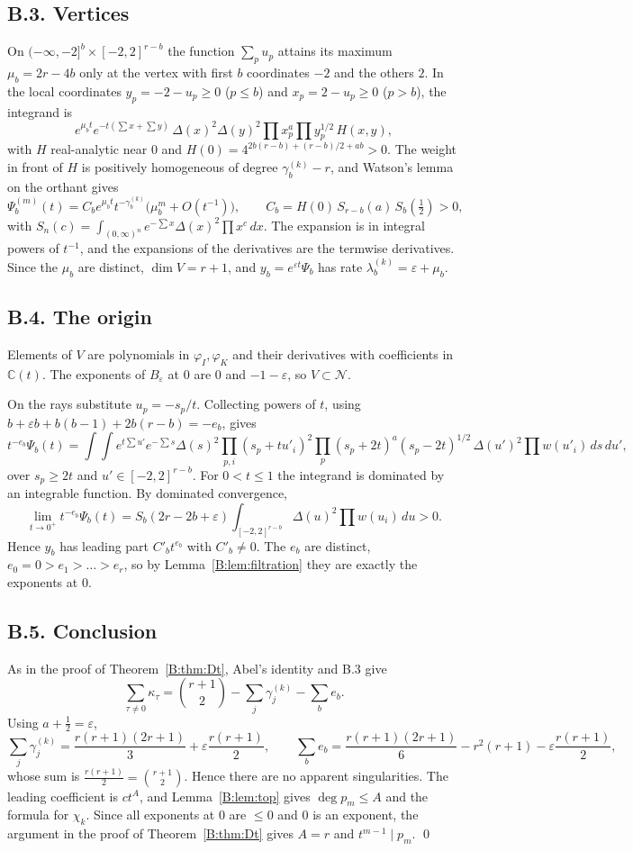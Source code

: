 \documentclass[11pt,a4paper]{article}
\theoremstyle{definition}
\theoremstyle{remark}
\newcommand{\C}{\mathbb C}
\numberwithin{equation}{section}
\begin{document}
\subsection*{B.3. Vertices}
On $(-\infty,-2]^b\times[-2,2]^{r-b}$ the function $\sum_pu_p$ attains its maximum $\mu_b=2r-4b$ only at the vertex with first $b$ coordinates $-2$ and the others $2$. In the local coordinates $y_p=-2-u_p\ge0$ ($p\le b$) and $x_p=2-u_p\ge0$ ($p>b$), the integrand is
\[
e^{\mu_bt}e^{-t(\sum x+\sum y)}\,\Delta(x)^2\Delta(y)^2\prod x_p^a\prod y_p^{1/2}\,H(x,y),
\]
with $H$ real-analytic near $0$ and $H(0)=4^{2b(r-b)+(r-b)/2+ab}>0$. The weight in front of $H$ is positively homogeneous of degree $\gamma^{(k)}_b-r$, and Watson's lemma on the orthant gives
\[
\Psi_b^{(m)}(t)=C_be^{\mu_bt}t^{-\gamma^{(k)}_b}\bigl(\mu_b^m+O(t^{-1})\bigr),\qquad C_b=H(0)\,S_{r-b}(a)\,S_b(\tfrac12)>0,
\]
with $S_n(c)=\int_{(0,\infty)^n}e^{-\sum x}\Delta(x)^2\prod x^c\,dx$. The expansion is in integral powers of $t^{-1}$, and the expansions of the derivatives are the termwise derivatives. Since the $\mu_b$ are distinct, $\dim V=r+1$, and $y_b=e^{\varepsilon t}\Psi_b$ has rate $\lambda^{(k)}_b=\varepsilon+\mu_b$.

\subsection*{B.4. The origin}
Elements of $V$ are polynomials in $\varphi_I,\varphi_K$ and their derivatives with coefficients in $\C(t)$. The exponents of $B_\varepsilon$ at $0$ are $0$ and $-1-\varepsilon$, so $V\subset\mathcal N$.

On the rays substitute $u_p=-s_p/t$. Collecting powers of $t$, using $b+\varepsilon b+b(b-1)+2b(r-b)=-e_b$, gives
\[
t^{-e_b}\Psi_b(t)=\int\!\!\int e^{t\sum u'}e^{-\sum s}\Delta(s)^2\prod_{p,i}(s_p+tu'_i)^2\prod_p(s_p+2t)^a(s_p-2t)^{1/2}\,\Delta(u')^2\prod w(u'_i)\,ds\,du',
\]
over $s_p\ge2t$ and $u'\in[-2,2]^{r-b}$. For $0<t\le1$ the integrand is dominated by an integrable function. By dominated convergence,
\[
\lim_{t\to0^+}t^{-e_b}\Psi_b(t)=S_b(2r-2b+\varepsilon)\int_{[-2,2]^{r-b}}\Delta(u)^2\prod w(u_i)\,du>0 .
\]
Hence $y_b$ has leading part $C'_bt^{e_b}$ with $C'_b\ne0$. The $e_b$ are distinct, $e_0=0>e_1>\dots>e_r$, so by Lemma~\ref{B:lem:filtration} they are exactly the exponents at $0$.

\subsection*{B.5. Conclusion}
As in the proof of Theorem~\ref{B:thm:Dt}, Abel's identity and B.3 give
\[
\sum_{\tau\ne0}\kappa_\tau=\binom{r+1}2-\sum_j\gamma^{(k)}_j-\sum_be_b .
\]
Using $a+\frac12=\varepsilon$,
\[
\sum_j\gamma^{(k)}_j=\frac{r(r+1)(2r+1)}3+\varepsilon\frac{r(r+1)}2,\qquad\sum_be_b=\frac{r(r+1)(2r+1)}6-r^2(r+1)-\varepsilon\frac{r(r+1)}2,
\]
whose sum is $\frac{r(r+1)}2=\binom{r+1}2$. Hence there are no apparent singularities. The leading coefficient is $ct^A$, and Lemma~\ref{B:lem:top} gives $\deg p_m\le A$ and the formula for $\chi_k$. Since all exponents at $0$ are $\le0$ and $0$ is an exponent, the argument in the proof of Theorem~\ref{B:thm:Dt} gives $A=r$ and $t^{m-1}\mid p_m$. \qed
\clearpage
\end{document}

